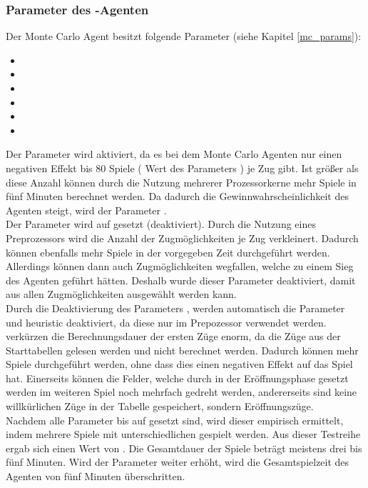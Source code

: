 \subsubsection*{Parameter des -Agenten}
\label{eval:agents:params:subsec-mc}
Der Monte Carlo Agent besitzt folgende Parameter (siehe Kapitel \ref{mc_params}):
\begin{itemize}
\item {}
\item {}
\item {}
\item {}
\item {}
\item {} 
\end{itemize}
Der Parameter  wird aktiviert, da es bei dem Monte Carlo Agenten nur einen negativen Effekt bis 80 Spiele ( Wert des Parameters ) je Zug gibt. Ist  größer als diese Anzahl können durch die Nutzung mehrerer Prozessorkerne mehr Spiele in fünf Minuten berechnet werden. Da dadurch die Gewinnwahrscheinlichkeit des Agenten steigt, wird der Parameter .
\\Der Parameter  wird auf  gesetzt (deaktiviert). Durch die Nutzung eines Preprozessors wird die Anzahl der Zugmöglichkeiten je Zug verkleinert. Dadurch können ebenfalls mehr Spiele in der vorgegeben Zeit durchgeführt werden. Allerdings können dann auch Zugmöglichkeiten wegfallen, welche zu einem Sieg des Agenten geführt hätten. Deshalb wurde dieser Parameter deaktiviert, damit aus allen Zugmöglichkeiten ausgewählt werden kann.
\\Durch die Deaktivierung des Parameters , werden automatisch die Parameter \\ und {heuristic} deaktiviert, da diese nur im Prepozessor verwendet werden.
\\ verkürzen die Berechnungsdauer der ersten Züge enorm, da die Züge aus der Starttabellen gelesen werden und nicht berechnet werden. Dadurch können mehr Spiele durchgeführt werden, ohne dass dies einen negativen Effekt auf das Spiel hat. Einerseits können die Felder, welche durch in der Eröffnungsphase gesetzt werden im weiteren Spiel noch mehrfach gedreht werden, andererseits sind keine willkürlichen Züge in der Tabelle gespeichert, sondern  Eröffnungszüge.
\\Nachdem alle Parameter bis auf  gesetzt sind, wird dieser empirisch ermittelt, indem mehrere Spiele mit unterschiedlichen  gespielt werden. Aus dieser Testreihe ergab sich einen  Wert von . Die Gesamtdauer der Spiele beträgt meistens drei bis fünf Minuten. Wird der Parameter weiter erhöht, wird die Gesamtspielzeit des Agenten von fünf Minuten überschritten.
